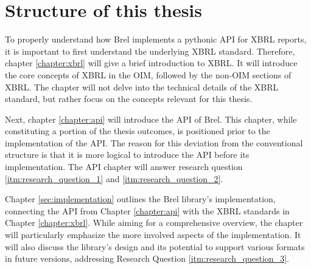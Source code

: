\section{Structure of this thesis}

To properly understand how Brel implements a pythonic API for XBRL reports, it is important to first understand the underlying XBRL standard.
Therefore, chapter \ref{chapter:xbrl} will give a brief introduction to XBRL. 
It will introduce the core concepts of XBRL in the OIM, followed by the non-OIM sections of XBRL.
The chapter will not delve into the technical details of the XBRL standard, but rather focus on the concepts relevant for this thesis.

Next, chapter \ref{chapter:api} will introduce the API of Brel.
This chapter, while constituting a portion of the thesis outcomes, is positioned prior to the implementation of the API.
The reason for this deviation from the conventional structure is that it is more logical to introduce the API before its implementation.
The API chapter will answer research question \ref{itm:research_question_1} and \ref{itm:research_question_2}.

Chapter \ref{sec:implementation} outlines the Brel library's implementation,
connecting the API from Chapter \ref{chapter:api} with the XBRL standards in Chapter \ref{chapter:xbrl}.
While aiming for a comprehensive overview,
the chapter will particularly emphasize the more involved aspects of the implementation.
It will also discuss the library's design and its potential to support various formats in future versions,
addressing Research Question \ref{itm:research_question_3}.

